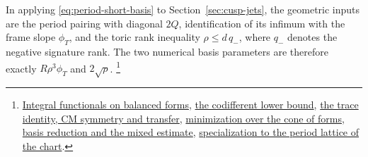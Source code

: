 In applying \eqref{eq:period-short-basis} to
Section~\ref{sec:cusp-jets}, the geometric inputs are the period
pairing with diagonal \(2Q\), identification of its infimum with
the frame slope \(\phi_T\), and the toric rank inequality
\(\rho\le d\,q_-\), where \(q_-\) denotes the negative signature
rank. The two numerical basis parameters are therefore exactly
\(R\rho^3\phi_T\) and \(2\sqrt{\rho}\).
\footnote{\href{https://github.com/ChristianKudeba/alpoge-rh-verification/blob/alpoge-source-7cbf7a0c/src/Formalism/SharpRestriction/Divisibility/GeneratorPowers/PhiCTie.lean}{Integral functionals on balanced forms},
\href{https://github.com/ChristianKudeba/alpoge-rh-verification/blob/alpoge-source-7cbf7a0c/src/Formalism/SharpRestriction/Divisibility/GeneratorPowers/PhiCMinI.lean}{the codifferent lower bound},
\href{https://github.com/ChristianKudeba/alpoge-rh-verification/blob/alpoge-source-7cbf7a0c/src/Formalism/SharpRestriction/Divisibility/GeneratorPowers/PhiCMinK.lean}{the trace identity, CM symmetry and transfer},
\href{https://github.com/ChristianKudeba/alpoge-rh-verification/blob/alpoge-source-7cbf7a0c/src/Formalism/SharpRestriction/Divisibility/GeneratorPowers/PhiCMinima.lean}{minimization over the cone of forms},
\href{https://github.com/ChristianKudeba/alpoge-rh-verification/blob/alpoge-source-7cbf7a0c/src/ReciprocityTheory/ReductiveGroups/ArithmeticGeometry/FirstCohomology/ReducedBasis.lean}{basis reduction and the mixed estimate},
\href{https://github.com/ChristianKudeba/alpoge-rh-verification/blob/alpoge-source-7cbf7a0c/src/Development/AbelianVarietyTheory/Proofs/DivisorProofs/ExistsShortPeriodLatticeBasisBalancedSlope.lean}{specialization to the period lattice of the chart}.}
